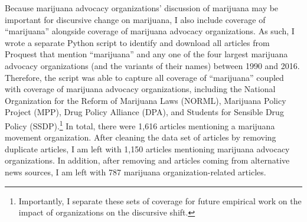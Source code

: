Because marijuana advocacy organizations' discussion of marijuana may be important for discursive change on marijuana, I also include coverage of ``marijuana'' alongside coverage of marijuana advocacy organizations. As such, I wrote a separate Python script to identify and download all articles from Proquest that mention ``marijuana'' and any one of the four largest marijuana advocacy organizations (and the variants of their names) between 1990 and 2016. Therefore, the script was able to capture all coverage of ``marijuana'' coupled with coverage of marijuana advocacy organizations, including the National Organization for the Reform of Marijuana Laws (NORML), Marijuana Policy Project (MPP), Drug Policy Alliance (DPA), and Students for Sensible Drug Policy (SSDP).\footnote{Importantly, I separate these sets of coverage for future empirical work on the impact of organizations on the discursive shift.} In total, there were 1,616 articles mentioning a marijuana movement organization. After cleaning the data set of articles by removing duplicate articles, I am left with 1,150 articles mentioning marijuana advocacy organizations. In addition, after removing and articles coming from alternative news sources, I am left with 787 marijuana organization-related articles.





